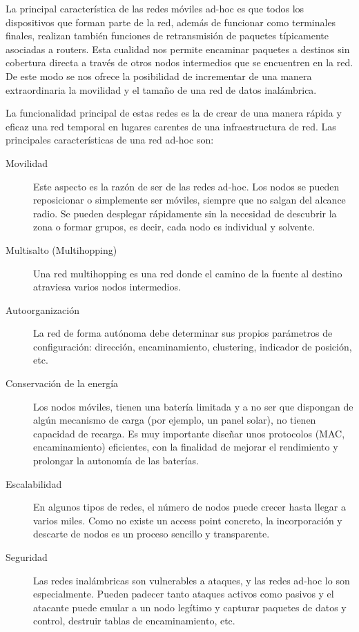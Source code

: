 La principal caracter\'istica de las redes m\'oviles ad-hoc es que todos los dispositivos que forman parte de la red, adem\'as
de funcionar como terminales finales, realizan tambi\'en funciones de retransmisi\'on de paquetes t\'ipicamente asociadas a
routers. Esta cualidad nos permite encaminar paquetes a destinos sin cobertura directa a trav\'es de otros nodos
intermedios que se encuentren en la red. De este modo se nos ofrece la posibilidad de incrementar de una manera
extraordinaria la movilidad y el tama\~no de una red de datos inal\'ambrica. 

La funcionalidad principal de estas redes es la de crear de una manera r\'apida y eficaz una red temporal en lugares
carentes de una infraestructura de red. Las principales caracter\'isticas de una red ad-hoc son: 

\begin{description}

\item[Movilidad]
Este aspecto es la raz\'on de ser de las redes ad-hoc. Los nodos se pueden reposicionar o simplemente ser
m\'oviles, siempre que no salgan del alcance radio. Se pueden desplegar r\'apidamente sin la necesidad de descubrir la zona
o formar grupos, es decir, cada nodo es individual y solvente. 

\item[Multisalto (Multihopping)]
Una red multihopping es una red donde el camino de la fuente al destino atraviesa
varios nodos intermedios. 

\item[Autoorganizaci\'on]
La red de forma aut\'onoma debe determinar sus propios par\'ametros de configuraci\'on: direcci\'on,
encaminamiento, clustering, indicador de posici\'on, etc. 

\item[Conservaci\'on de la energ\'ia] 
Los nodos m\'oviles, tienen una bater\'ia limitada y a no ser que dispongan de alg\'un
mecanismo de carga (por ejemplo, un panel solar), no tienen capacidad de recarga. Es muy importante dise\~nar unos
protocolos (MAC, encaminamiento) eficientes, con la finalidad de mejorar el rendimiento y prolongar la autonom\'ia de las
bater\'ias. 

\item[Escalabilidad]
En algunos tipos de redes, el n\'umero de nodos puede crecer hasta llegar a varios miles. Como no
existe un access point concreto, la incorporaci\'on y descarte de nodos es un proceso sencillo y transparente. 

\item[Seguridad]
Las redes inal\'ambricas son vulnerables a ataques, y las redes ad-hoc lo son especialmente. Pueden
padecer tanto ataques activos como pasivos y el atacante puede emular a un nodo leg\'itimo y capturar paquetes de datos y
control, destruir tablas de encaminamiento, etc.
\end{description}

